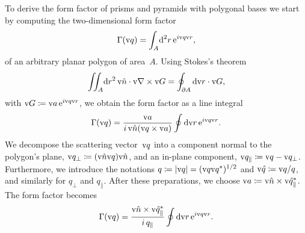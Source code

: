 To derive the form factor of prisms and pyramids with polygonal bases
we start by computing the two-dimensional form factor
\begin{equation}\label{Eff2d}
  \Gamma(\text{v}{q})=\int_A\!\text{d}^2r\, \text{e}^{i\text{v}{q}\text{v}{r}},
\end{equation}
of an arbitrary planar polygon of area~$A$.
Using Stokes's theorem
\begin{equation}
  \iint_A\!\text{d} r^2\,\text{v}{\hat n}\cdot\text{v}{\nabla}\times\text{v}{G} = \oint_{\partial A} \text{d}\text{v}{r}\cdot\text{v}{G},
\end{equation}
with $\text{v}{G}\coloneqq\text{v}{a}\, \text{e}^{i\text{v}{q}\text{v}{r}}$,
we obtain the form factor as a line integral
\begin{equation}
  \Gamma(\text{v}{q})=\frac{\text{v}{a}}{i\, \text{v}{\hat n}(\text{v}{q}\times\text{v}{a})} \oint \text{d}\text{v}{r}\,\text{e}^{i\text{v}{q}\text{v}{r}}.
\end{equation}
We decompose the scattering vector~$\text{v}{q}$ into
a component normal to the polygon's plane,
$\text{v}{q}_\perp\coloneqq (\text{v}{\hat n}\text{v}{q})\text{v}{\hat n}$, and
an in-plane component, $\text{v}{q}_\parallel\coloneqq\text{v}{q}-\text{v}{q}_\perp$.
Furthermore, we introduce the notations
$q\coloneqq|\text{v}{q}|=(\text{v}{q}\text{v}{q}^*)^{1/2}$ and $\text{v}{\hat q}\coloneqq\text{v}{q}/q$,
and similarly for $q_\perp$ and $q_\parallel$.
After these preparations,
we choose $\text{v}{a}\coloneqq\text{v}{\hat n}\times\text{v}{\hat q}_\parallel^*$.
The form factor becomes
\begin{equation}
  \Gamma(\text{v}{q})=\frac{\text{v}{\hat n}\times\text{v}{\hat q}_\parallel^*}{i\,q_\parallel} \oint \text{d}\text{v}{r}\,\text{e}^{i\text{v}{q}\text{v}{r}}.
\end{equation}

